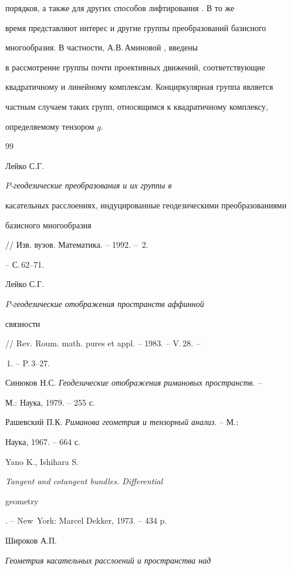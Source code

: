 порядков, а также для других способов лифтирования \cite{6}. В то же


время представляют интерес и другие группы преобразований базисного


многообразия. В частности, А.В.\,Аминовой \cite{14}, \cite{19} введены


в рассмотрение группы почти проективных движений, соответствующие


квадратичному и линейному комплексам. Конциркулярная группа является


частным случаем таких групп, относящимся к квадратичному комплексу,


определяемому тензором $g$.





\begin{thebibliography}{99}







Лейко С.Г. {\em $P$-геодезические преобразования и их группы в


касательных расслоениях, индуцированные геодезическими преобразованиями


базисного многообразия} // Изв. вузов. Математика. -- 1992. -- \No\,2.


-- С.\,62--71.




Лейко С.Г. {\em $P$-геодезические отображения пространств аффинной


связности} // Rev. Roum. math. pures et appl. -- 1983. -- V.\,28. --


\No\,1. -- P.\,3--27.




Синюков Н.С. {\em Геодезические отображения римановых пространств}. --


М.: Наука, 1979. -- 255 с.




Рашевский П.К. {\em Риманова геометрия и тензорный анализ}. -- М.:


Наука, 1967. -- 664 с.




Yano K., Ishihara S. {\em Tangent and cotangent bundles. Differential


geometry}. -- New~York: Marcel Dekker, 1973. -- 434 p.




Широков А.П. {\em Геометрия касательных расслоений и пространства над


}
\end{thebibliography}
